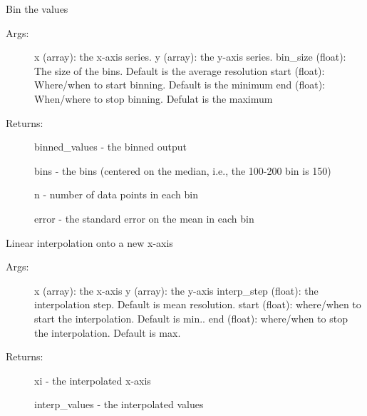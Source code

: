\documentclass[letterpaper,10pt,english]{sphinxmanual}
\begin{document}
\begin{fulllineitems}
\label{\detokenize{Timeseries:pyleoclim.Timeseries.bin}}
Bin the values
\begin{description}
\item[{Args:}] \leavevmode
x (array): the x-axis series.
y (array): the y-axis series.
bin\_size (float): The size of the bins. Default is the average resolution
start (float): Where/when to start binning. Default is the minimum
end (float): When/where to stop binning. Defulat is the maximum

\item[{Returns:}] \leavevmode
binned\_values - the binned output

bins - the bins (centered on the median, i.e., the 100-200 bin is 150)

n - number of data points in each bin

error -  the standard error on the mean in each bin

\end{description}

\end{fulllineitems}


\begin{fulllineitems}
\label{\detokenize{Timeseries:pyleoclim.Timeseries.interp}}
Linear interpolation onto a new x-axis
\begin{description}
\item[{Args:}] \leavevmode
x (array): the x-axis
y (array): the y-axis
interp\_step (float): the interpolation step. Default is mean resolution.
start (float): where/when to start the interpolation. Default is min..
end (float): where/when to stop the interpolation. Default is max.

\item[{Returns:}] \leavevmode
xi - the interpolated x-axis

interp\_values - the interpolated values

\end{description}

\end{fulllineitems}
\end{document}
